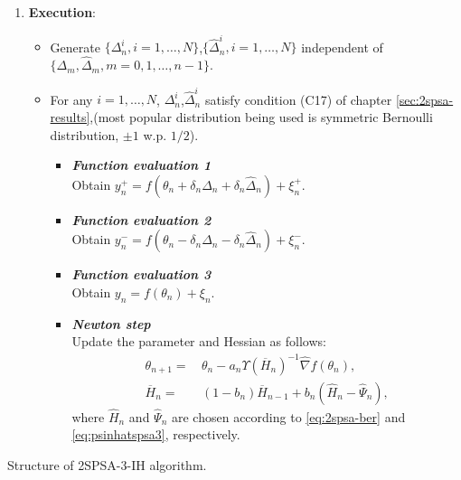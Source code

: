 \begin{algorithm}[!htp]

\begin{enumerate}

 \item \textbf{Execution}: \\
  {
 \begin{itemize}
 \item Generate $\{\Delta_n^{i}, i=1,\ldots,N\}$,$\{\widehat\Delta_n^{i}, i=1,\ldots,N\}$ independent of $\{\Delta_m,\widehat\Delta_m, m=0,1,\ldots,n-1\}$.  
 \item For any $i=1,\ldots,N$, $\Delta_n^{i}$,$\widehat\Delta_n^{i}$  satisfy condition (C17) of chapter \ref{sec:2spsa-results},(most popular distribution being used is symmetric Bernoulli distribution, $\pm 1$ w.p. $1/2$).
\begin{itemize}
\item \textbf{\emph {Function evaluation 1} }\\ \hspace{4em} Obtain $y_n^+ = f(\theta_n+\delta_n \Delta_n +\delta_n \widehat\Delta_n) + \xi_n^+$.
\item \textbf{\emph {Function evaluation 2} }\\ \hspace{4em} Obtain $y_n^- = f(\theta_n -\delta_n\Delta_n-\delta_n\widehat\Delta_n) + \xi_n^-$.
\item \textbf{\emph {Function evaluation 3} }\\ \hspace{4em} Obtain $y_n = f(\theta_n) + \xi_n$.
\item \textbf{\emph {Newton step}}\\ \hspace{4.2em} Update the parameter and Hessian as follows:
\begin{align} \label{eq:2spsa-3-theta}
\theta_{n+1} = \,& \theta_n - a_n \Upsilon(\overline H_n)^{-1}\widehat\nabla f(\theta_n),\\
\overline H_n =\,& (1-b_{n})  \overline H_{n-1} + b_{n} ( \widehat H_n - \widehat \Psi_n),\label{eq:2spsa-3-ih}
\end{align}
where $\widehat H_n$ and $\widehat \Psi_n$ are chosen according to \eqref{eq:2spsa-ber} and \eqref{eq:psinhatspsa3}, respectively. 
\end{itemize}

\end{itemize}
}
\end{enumerate}

\caption{Structure of 2SPSA-3-IH algorithm.}
\label{alg:spsa-3-ih-structure}
\end{algorithm}

